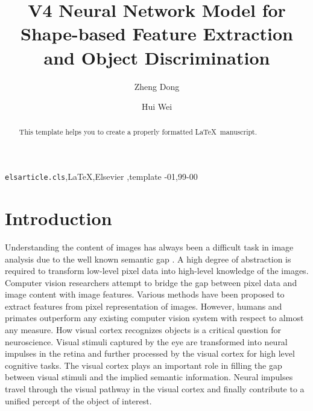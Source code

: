 \documentclass[5p]{elsarticle}
\begin{document}
\begin{frontmatter}

\title{V4 Neural Network Model for Shape-based Feature Extraction and Object Discrimination}

\author{Zheng Dong}

\author{Hui Wei}

\address{Laboratory of Cognitive Modeling and Algorithms, %
School of Computer Science, Fudan University, Shanghai, China}

\begin{abstract}
This template helps you to create a properly formatted \LaTeX\ manuscript.
\end{abstract}

\begin{keyword}
\texttt{elsarticle.cls}\sep \LaTeX\sep Elsevier \sep template
-01\sep  99-00
\end{keyword}

\end{frontmatter}

\linenumbers

\section{Introduction}

Understanding the content of images has always been a difficult task in image analysis
due to the well known semantic gap \cite{smeulders2000}.
A high degree of abstraction is required to transform low-level pixel data into high-level knowledge of the images.
Computer vision researchers attempt to bridge the gap between pixel data and image content with image features.
Various methods have been proposed to extract features from pixel representation of images.
However, humans and primates outperform any existing computer vision system with respect to almost any measure.
How visual cortex recognizes objects is a critical question for neuroscience.
Visual stimuli captured by the eye are transformed into neural impulses in the retina and further processed by 
the visual cortex for high level cognitive tasks.
The visual cortex plays an important role in filling the gap
between visual stimuli and the implied semantic information.
Neural impulses travel through the visual pathway \cite{ettlinger1990}
in the visual cortex and finally contribute to a unified percept of the object of interest. 
\end{document}
